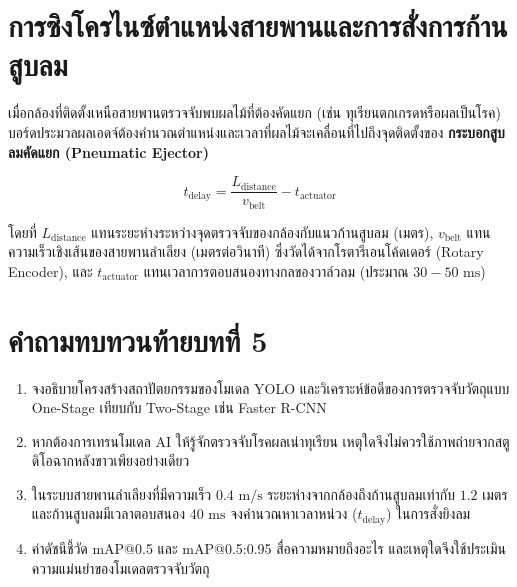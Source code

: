 \section{การซิงโครไนซ์ตำแหน่งสายพานและการสั่งการก้านสูบลม}

เมื่อกล้องที่ติดตั้งเหนือสายพานตรวจจับพบผลไม้ที่ต้องคัดแยก (เช่น ทุเรียนตกเกรดหรือผลเป็นโรค) บอร์ดประมวลผลเอดจ์ต้องคำนวณตำแหน่งและเวลาที่ผลไม้จะเคลื่อนที่ไปถึงจุดติดตั้งของ \textbf{กระบอกสูบลมคัดแยก (Pneumatic Ejector)}

\begin{equation}
t_{\text{delay}} = \frac{L_{\text{distance}}}{v_{\text{belt}}} - t_{\text{actuator}}
\label{eq:conveyor_delay}
\end{equation}

โดยที่ $L_{\text{distance}}$ แทนระยะห่างระหว่างจุดตรวจจับของกล้องกับแนวก้านสูบลม (เมตร), $v_{\text{belt}}$ แทนความเร็วเชิงเส้นของสายพานลำเลียง (เมตรต่อวินาที) ซึ่งวัดได้จากโรตารีเอนโค้ดเดอร์ (Rotary Encoder), และ $t_{\text{actuator}}$ แทนเวลาการตอบสนองทางกลของวาล์วลม (ประมาณ $30 - 50\text{ ms}$)

\section*{คำถามทบทวนท้ายบทที่ 5}

\begin{enumerate}
    \item จงอธิบายโครงสร้างสถาปัตยกรรมของโมเดล YOLO และวิเคราะห์ข้อดีของการตรวจจับวัตถุแบบ One-Stage เทียบกับ Two-Stage เช่น Faster R-CNN
    \item หากต้องการเทรนโมเดล AI ให้รู้จักตรวจจับโรคผลเน่าทุเรียน เหตุใดจึงไม่ควรใช้ภาพถ่ายจากสตูดิโอฉากหลังขาวเพียงอย่างเดียว
    \item ในระบบสายพานลำเลียงที่มีความเร็ว $0.4\text{ m/s}$ ระยะห่างจากกล้องถึงก้านสูบลมเท่ากับ $1.2\text{ เมตร}$ และก้านสูบลมมีเวลาตอบสนอง $40\text{ ms}$ จงคำนวณหาเวลาหน่วง ($t_{\text{delay}}$) ในการสั่งยิงลม
    \item ค่าดัชนีชี้วัด mAP@0.5 และ mAP@0.5:0.95 สื่อความหมายถึงอะไร และเหตุใดจึงใช้ประเมินความแม่นยำของโมเดลตรวจจับวัตถุ
\end{enumerate}
\clearpage
